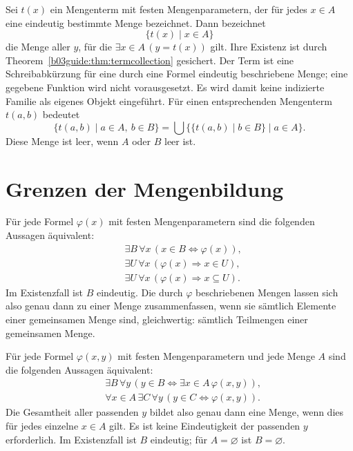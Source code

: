 \begin{definition}
Sei $t(x)$ ein Mengenterm mit festen Mengenparametern, der
für jedes $x\in A$ eine eindeutig bestimmte Menge bezeichnet.
Dann bezeichnet
\[
 \{t(x)\mid x\in A\}
\]
die Menge aller $y$, für die $\exists x\in A\,(y=t(x))$ gilt.
Ihre Existenz ist durch
Theorem~\ref{b03guide:thm:termcollection} gesichert.
Der Term ist eine Schreibabkürzung für eine durch eine Formel
eindeutig beschriebene Menge; eine gegebene Funktion wird nicht
vorausgesetzt.
Es wird damit keine indizierte Familie als eigenes Objekt eingeführt.
Für einen entsprechenden Mengenterm $t(a,b)$ bedeutet
\[
 \{t(a,b)\mid a\in A,\ b\in B\}
   =\bigcup\{\{t(a,b)\mid b\in B\}\mid a\in A\}.
\]
Diese Menge ist leer, wenn $A$ oder $B$ leer ist.
\end{definition}

\section{Grenzen der Mengenbildung}

\begin{theorem}
\label{b03guide:thm:setexistence}
Für jede Formel $\varphi(x)$ mit festen Mengenparametern sind
die folgenden Aussagen äquivalent:
\[
\begin{aligned}
 &\exists B\,\forall x\,(x\in B\Longleftrightarrow\varphi(x)),\\
 &\exists U\,\forall x\,(\varphi(x)\Rightarrow x\in U),\\
 &\exists U\,\forall x\,(\varphi(x)\Rightarrow x\subseteq U).
\end{aligned}
\]
Im Existenzfall ist $B$ eindeutig. Die durch $\varphi$ beschriebenen
Mengen lassen sich also genau dann zu einer Menge zusammenfassen,
wenn sie sämtlich Elemente einer gemeinsamen Menge sind,
gleichwertig: sämtlich Teilmengen einer gemeinsamen Menge.
\cite{koepke}
\end{theorem}

\begin{theorem}
Für jede Formel $\varphi(x,y)$ mit festen Mengenparametern und
jede Menge $A$ sind die folgenden Aussagen äquivalent:
\[
\begin{aligned}
 &\exists B\,\forall y\,
       (y\in B\Longleftrightarrow\exists x\in A\,\varphi(x,y)),\\
 &\forall x\in A\,\exists C\,\forall y\,
       (y\in C\Longleftrightarrow\varphi(x,y)).
\end{aligned}
\]
Die Gesamtheit aller passenden $y$ bildet also genau dann eine
Menge, wenn dies für jedes einzelne $x\in A$ gilt.
Es ist keine Eindeutigkeit der passenden $y$ erforderlich.
Im Existenzfall ist $B$ eindeutig; für $A=\varnothing$ ist
$B=\varnothing$. \cite{koepke,pila}
\end{theorem}

